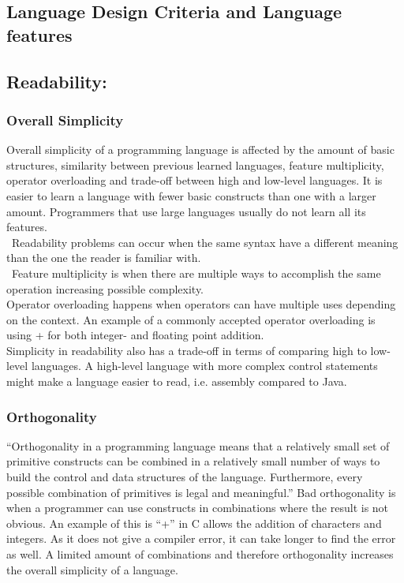 \subsection{Language Design Criteria and Language features}
\label{language-design-criteria}
\label{design-criteria-theory}
\subsection*{Readability:}
\subsubsection*{Overall Simplicity}
Overall simplicity of a programming language is affected by the amount of basic structures, similarity between previous learned languages, feature multiplicity, operator overloading and trade-off between high and low-level languages.
It is easier to learn a language with fewer basic constructs than one with a larger amount. Programmers that use large languages usually do not learn all its features. \\\
Readability problems can occur when the same syntax have a different meaning than the one the reader is familiar with. \\\
Feature multiplicity is when there are multiple ways to accomplish the same operation increasing possible complexity. \\
Operator overloading happens when operators can have multiple uses depending on the context. An example of a commonly accepted operator overloading is using + for both integer- and floating point addition. \\
Simplicity in readability also has a trade-off in terms of comparing high to low-level languages. A high-level language with more complex control statements might make a language easier to read, i.e. assembly compared to Java.

\subsubsection*{Orthogonality}
“Orthogonality in a programming language means that a relatively small set
of primitive constructs can be combined in a relatively small number of ways
to build the control and data structures of the language. Furthermore, every possible combination of primitives is legal and meaningful.”
Bad orthogonality is when a programmer can use constructs in combinations where the result is not obvious. An example of this is “+” in C allows the addition of characters and integers. As it does not give a compiler error, it can take longer to find the error as well.
A limited amount of combinations and therefore orthogonality increases the overall simplicity of a language.

